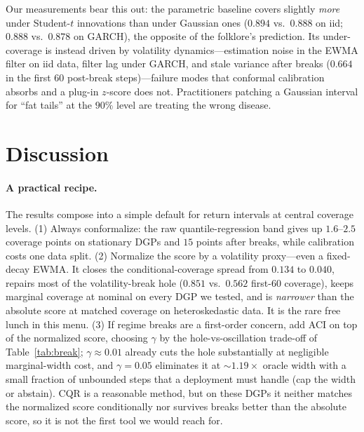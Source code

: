 \documentclass[11pt]{article}
\begin{document}
Our measurements bear this out: the parametric baseline covers slightly
\emph{more} under Student-$t$ innovations than under Gaussian ones ($0.894$
vs.\ $0.888$ on iid; $0.888$ vs.\ $0.878$ on GARCH), the opposite of the
folklore's prediction. Its under-coverage is instead driven by volatility
dynamics---estimation noise in the EWMA filter on iid data, filter lag under
GARCH, and stale variance after breaks ($0.664$ in the first $60$ post-break
steps)---failure modes that conformal calibration absorbs and a plug-in
$z$-score does not. Practitioners patching a Gaussian interval for ``fat
tails'' at the $90\%$ level are treating the wrong disease.

\section{Discussion}
\label{sec:discussion}

\paragraph{A practical recipe.} The results compose into a simple default for
return intervals at central coverage levels. (1) Always conformalize: the raw
quantile-regression band gives up $1.6$--$2.5$ coverage points on stationary
DGPs and $15$ points after breaks, while calibration costs one data split.
(2) Normalize the score by a volatility proxy---even a fixed-decay EWMA. It
closes the conditional-coverage spread from $0.134$ to $0.040$, repairs most
of the volatility-break hole ($0.851$ vs.\ $0.562$ first-$60$ coverage), keeps
marginal coverage at nominal on every DGP we tested, and is \emph{narrower}
than the absolute score at matched coverage on heteroskedastic data. It is
the rare free lunch in this menu. (3) If regime breaks are a first-order
concern, add ACI on top of the normalized score, choosing $\gamma$ by the
hole-vs-oscillation trade-off of Table~\ref{tab:break}; $\gamma\approx0.01$
already cuts the hole substantially at negligible marginal-width cost, and
$\gamma=0.05$ eliminates it at ${\sim}1.19\times$ oracle width with a small
fraction of unbounded steps that a deployment must handle (cap the width or
abstain). CQR is a reasonable method, but on these DGPs it neither matches
the normalized score conditionally nor survives breaks better than the
absolute score, so it is not the first tool we would reach for.
\end{document}
